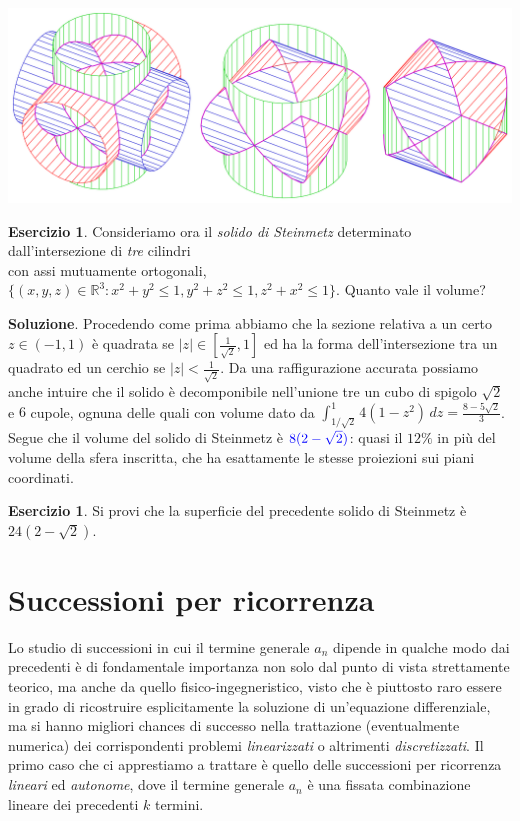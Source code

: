 \documentclass[a4paper,twoside]{article}
\newcommand{\R}{\mathbb{R}}
\theoremstyle{definition}
\newtheorem{ex}[theorem]{Esercizio}
\numberwithin{theorem}{section}
\begin{document}
\begin{center}
\includegraphics[scale=0.18]{Steinmetz.png} 
\end{center}
\begin{ex} Consideriamo ora il \emph{solido di Steinmetz} determinato dall'intersezione di \emph{tre} cilindri\\ con assi mutuamente ortogonali, $\{(x,y,z)\in\R^3: x^2+y^2\leq 1, y^2+z^2\leq 1, z^2+x^2\leq 1\}.$ 
Quanto vale il volume?  
\end{ex}
\textbf{Soluzione}. Procedendo come prima abbiamo che la sezione relativa a un certo $z\in(-1,1)$ è quadrata se $|z|\in\left[\frac{1}{\sqrt{2}},1\right]$ ed ha la forma dell'intersezione tra un quadrato ed un cerchio se $|z|<\frac{1}{\sqrt{2}}$. Da una raffigurazione accurata possiamo anche intuire che il solido è decomponibile nell'unione tre un cubo di spigolo $\sqrt{2}$ e $6$ cupole, ognuna delle quali con volume dato da $\int_{1/\sqrt{2}}^{1}4(1-z^2)\,dz=\frac{8-5\sqrt{2}}{3}$. Segue che il volume del solido di Steinmetz è $\color{blue}8(2-\sqrt{2})$: quasi il $12\%$ in più del volume della sfera inscritta, che ha esattamente le stesse proiezioni sui piani coordinati.

\begin{ex} Si provi che la superficie del precedente solido di Steinmetz è $24(2-\sqrt{2})$.
 
\end{ex}


\newpage

\section{Successioni per ricorrenza}
Lo studio di successioni in cui il termine generale $a_n$ dipende in qualche modo dai precedenti è di fondamentale importanza non solo dal punto di vista strettamente teorico, ma anche da quello fisico-ingegneristico, visto che è piuttosto raro essere in grado di ricostruire esplicitamente la soluzione di un'equazione differenziale, ma si hanno migliori chances di successo nella trattazione (eventualmente numerica) dei corrispondenti problemi \emph{linearizzati} o altrimenti \emph{discretizzati}. Il primo caso che ci apprestiamo a trattare è quello delle successioni per ricorrenza \emph{lineari} ed \emph{autonome}, dove il termine generale $a_n$ è una fissata combinazione lineare dei precedenti $k$ termini.
\end{document}
